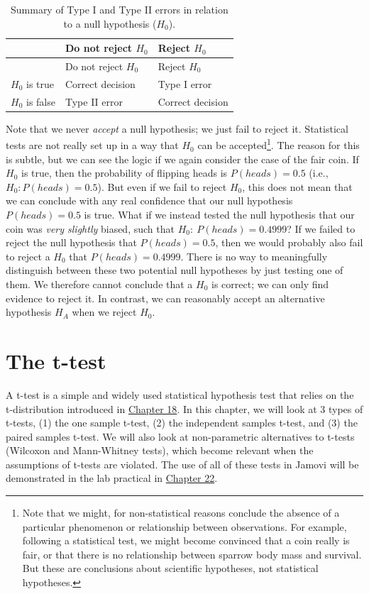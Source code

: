 \documentclass[
]{scrbook}
\begin{document}
\begin{longtable}[]{@{}lll@{}}
\caption{Summary of Type I and Type II errors in relation to a null hypothesis (\(H_{0}\)).}\tabularnewline
\toprule
& Do not reject \(H_{0}\) & Reject \(H_{0}\) \\
\midrule
\endfirsthead
\toprule
& Do not reject \(H_{0}\) & Reject \(H_{0}\) \\
\midrule
\endhead
\(H_{0}\) is true & Correct decision & Type I error \\
\(H_{0}\) is false & Type II error & Correct decision \\
\bottomrule
\end{longtable}

Note that we never \emph{accept} a null hypothesis; we just fail to reject it.
Statistical tests are not really set up in a way that \(H_{0}\) can be accepted\footnote{Note that we might, for non-statistical reasons conclude the absence of a particular phenomenon or relationship between observations. For example, following a statistical test, we might become convinced that a coin really is fair, or that there is no relationship between sparrow body mass and survival. But these are conclusions about scientific hypotheses, not statistical hypotheses.}.
The reason for this is subtle, but we can see the logic if we again consider the case of the fair coin.
If \(H_{0}\) is true, then the probability of flipping heads is \(P(heads) = 0.5\) (i.e., \(H_{0}: P(heads) = 0.5\)).
But even if we fail to reject \(H_{0}\), this does not mean that we can conclude with any real confidence that our null hypothesis \(P(heads) = 0.5\) is true.
What if we instead tested the null hypothesis that our coin was \emph{very slightly} biased, such that \(H_{0}:\:P(heads) = 0.4999\)?
If we failed to reject the null hypothesis that \(P(heads) = 0.5\), then we would probably also fail to reject a \(H_{0}\) that \(P(heads) = 0.4999\).
There is no way to meaningfully distinguish between these two potential null hypotheses by just testing one of them.
We therefore cannot conclude that a \(H_{0}\) is correct; we can only find evidence to reject it.
In contrast, we can reasonably accept an alternative hypothesis \(H_{A}\) when we reject \(H_{0}\).

\hypertarget{Chapter_21}{%
\chapter{The t-test}\label{Chapter_21}}

A t-test is a simple and widely used statistical hypothesis test that relies on the t-distribution introduced in \protect\hyperlink{Chapter_18}{Chapter 18}.
In this chapter, we will look at 3 types of t-tests, (1) the one sample t-test, (2) the independent samples t-test, and (3) the paired samples t-test.
We will also look at non-parametric alternatives to t-tests (Wilcoxon and Mann-Whitney tests), which become relevant when the assumptions of t-tests are violated.
The use of all of these tests in Jamovi will be demonstrated in the lab practical in \protect\hyperlink{Chapter_22}{Chapter 22}.
\end{document}
